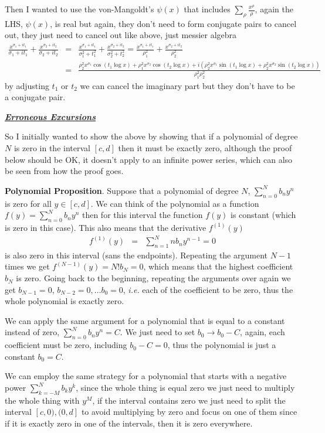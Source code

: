 \documentclass[aps,preprint,preprintnumbers,nofootinbib,showpacs,prd]{revtex4-1}
\newcommand{\ie}{{\it i.e.} }
\newcommand{\nbea}{\begin{eqnarray*}}
\newcommand{\neea}{\end{eqnarray*}}
\begin{document}
Then I wanted to use the von-Mangoldt's $\psi(x)$ that includes $\sum_\rho \frac{x^\rho}{\rho}$, again the LHS, $\psi(x)$, is real but again, they don't need to form conjugate pairs to cancel out, they just need to cancel out like above, just messier algebra
%
\nbea
\frac{x^{\sigma_1 + it_1}}{\sigma_1 + it_1} + \frac{x^{\sigma_2 + it_2}}{\sigma_2 + it_2} & = & \frac{x^{\sigma_1 + it_1}}{\sigma_1^2 + t_1^2} + \frac{x^{\sigma_2 + it_2}}{\sigma_2^2 + t_2^2} = \frac{x^{\sigma_1 + it_1}}{\rho_1^2} + \frac{x^{\sigma_2 + it_2}}{\rho_2^2} \\
& = & \frac{\rho_2^2 x^{\sigma_1} \cos(t_1 \log x) + \rho_1^2 x^{\sigma_2} \cos(t_2 \log x) + i (\rho_2^2 x^{\sigma_1} \sin(t_1 \log x) + \rho_2^2 x^{\sigma_2} \sin(t_2 \log x))}{\rho_1^2\rho_2^2}
\neea
%
by adjusting $t_1$ or $t_2$ we can cancel the imaginary part but they don't have to be a conjugate pair.

\bigskip
\underline{\textbf{\textit{Erroneous Excursions}}}

So I initially wanted to show the above by showing that if a polynomial of degree $N$ is zero in the interval $[c,d]$ then it must be exactly zero, although the proof below should be OK, it doesn't apply to an infinite power series, which can also be seen from how the proof goes.

{\bf Polynomial Proposition}. Suppose that a polynomial of degree $N$, $\sum_{n=0}^N b_n y^n$ is zero for all $y \in [c,d]$. We can think of the polynomial as a function $f(y) = \sum_{n=0}^N b_n y^n$ then for this interval the function $f(y)$ is constant (which is zero in this case). This also means that the derivative $f^{(1)}(y)$ 
%
\nbea
f^{(1)}(y) & = & \sum_{n=1}^N n b_n y^{n-1} = 0
\neea
%
is also zero in this interval (sans the endpoints). Repeating the argument $N-1$ times we get $f^{(N-1)}(y) = N! b_N = 0$, which means that the highest coefficient $b_N$ is zero. Going back to the beginning, repeating the arguments over again we get $b_{N-1} = 0$, $b_{N-2} = 0, \dots b_0 = 0$, \ie each of the coefficient to be zero, thus the whole polynomial is exactly zero.

We can apply the same argument for a polynomial that is equal to a constant instead of zero, $\sum_{n=0}^N b_n y^n = C$. We just need to set $b_0 \to b_0 - C$, again, each coefficient must be zero, including $b_0 - C = 0$, thus the polynomial is just a constant $b_0 = C$.

We can employ the same strategy for a polynomial that starts with a negative power $\sum_{k=-M}^N b_k y^k$, since the whole thing is equal zero we just need to multiply the whole thing with $y^M$, if the interval contains zero we just need to split the interval $[c,0),(0,d]$ to avoid multiplying by zero and focus on one of them since if it is exactly zero in one of the intervals, then it is zero everywhere.
\end{document}
